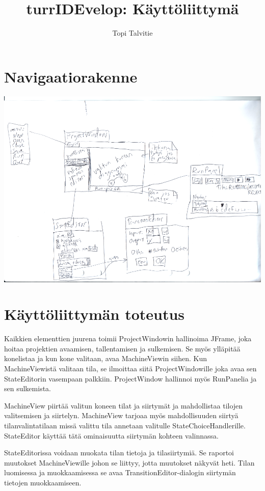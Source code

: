 \documentclass[a4paper, 11pt, finnish]{article}
\author{Topi Talvitie}
\title{turrIDEvelop: Käyttöliittymä}
\begin{document}
\maketitle

\section{Navigaatiorakenne}
\begin{centering}
\includegraphics[width=14cm]{navigaatio.png}
\end{centering}

\section{Käyttöliittymän toteutus}
Kaikkien elementtien juurena toimii ProjectWindowin hallinoima JFrame, joka
hoitaa projektien avaamisen, tallentamisen ja sulkemisen. Se myös ylläpitää
konelistaa ja kun kone valitaan, avaa MachineViewin siihen. Kun MachineViewistä
valitaan tila, se ilmoittaa siitä ProjectWindowille joka avaa sen StateEditorin
vasempaan palkkiin. ProjectWindow hallinnoi myös RunPanelia ja sen sulkemista.

MachineView piirtää valitun koneen tilat ja siirtymät ja mahdollistaa tilojen
valitsemisen ja siirtelyn. MachineView tarjoaa myös mahdollisuuden siirtyä
tilanvalintatilaan missä valittu tila annetaan valitulle
StateChoiceHandlerille. StateEditor käyttää tätä ominaisuutta siirtymän kohteen
valinnassa.

StateEditorissa voidaan muokata tilan tietoja ja tilasiirtymiä. Se raportoi
muutokset MachineViewille johon se liittyy, jotta muutokset näkyvät heti. Tilan
luomisessa ja muokkaamisessa se avaa TransitionEditor-dialogin siirtymän
tietojen muokkaamiseen.
\end{document}
